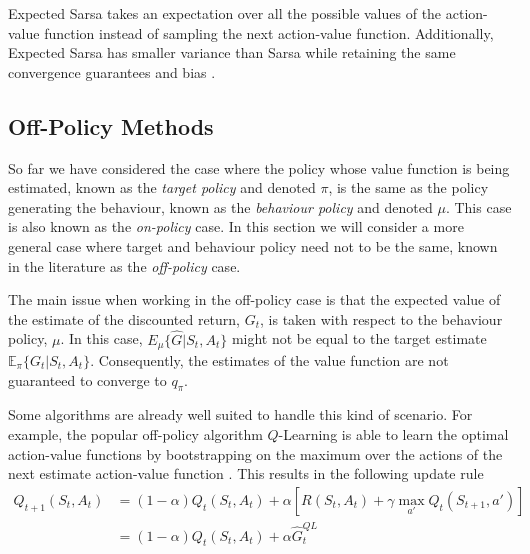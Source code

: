 Expected Sarsa takes an expectation over all the possible values of the action-value function instead of sampling the next action-value function.
Additionally, Expected Sarsa has smaller variance than Sarsa while retaining the same convergence guarantees and bias \parencite{harm-hado-expected-sarsa}.

\subsection{Off-Policy Methods}
\label{subsec:offpolicy_methods}

So far we have considered the case where the policy whose value function is being estimated, known as the \textit{target policy} and denoted $\pi$, is the same as the policy generating the behaviour, known as the \textit{behaviour policy} and denoted $\mu$.
This case is also known as the \textit{on-policy} case. 
In this section we will consider a more general case where target and behaviour policy need not to be the same, known in the literature as the \textit{off-policy} case. 

The main issue when working in the off-policy case is that the expected value of the estimate of the discounted return, $G_t$, is taken with respect to the behaviour policy, $\mu$.
In this case, $E_\mu \{ \hat{G} | S_t, A_t \}$ might not be equal to the target estimate $\mathbb{E}_\pi \{G_t| S_t, A_t \}$.
Consequently, the estimates of the value function are not guaranteed to converge to $q_\pi$.

Some algorithms are already well suited to handle this kind of scenario.
For example, the popular off-policy algorithm $Q$-Learning is able to learn the optimal action-value functions by bootstrapping on the maximum  over the actions of the next estimate action-value function \parencite{watkins1989qlearn,watkins1992}.
This results in the following update rule
\begin{align}
\label{eq:qlearning_update}
Q_{t+1}(S_t,A_t) &= (1-\alpha) Q_t(S_t, A_t) + \alpha [R(S_t, A_t) + \gamma \max_{a'} Q_t(S_{t+1}, a')]
	\nonumber \\
%
&= (1-\alpha) Q_t(S_t, A_t) + \alpha \hat{G}^{QL}_t
\end{align}

